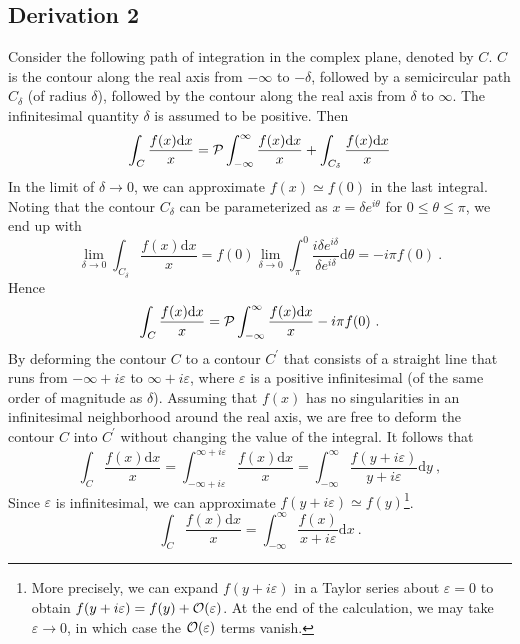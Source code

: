 \documentclass[11pt,a4paper]{article}
\newcommand{\dif}{\mathrm{d}}
\begin{document}
\subsection{Derivation 2}
Consider the following path of integration in the complex plane, denoted by $C$. $C$ is the contour along the real axis from $-\infty$ to $-\delta$, followed by a semicircular path $C_\delta$ (of radius $\delta$), followed by the contour along the real axis from $\delta$ to $\infty$. The infinitesimal quantity $\delta$ is assumed to be positive. Then
\begin{equation}
\int_{C} \dfrac{f(x) \dif x}{x} = {\cal P} \int_{-\infty}^\infty \dfrac{f(x) \dif x}{x} +\int_{C_\delta} \dfrac{f(x) \dif x}{x}
\end{equation}
In the limit of $\delta \rightarrow 0$, we can approximate $f(x) \simeq f(0)$ in the last integral. Noting that the contour $C_\delta$ can be parameterized as $x = \delta e^{i\theta}$ for $0 \leqslant \theta \leqslant \pi$, we end up with 
\begin{equation}
 \lim_{\delta \rightarrow 0} \int_{C_\delta} \dfrac{f(x) \dif x}{x} = f(0) \lim_{\delta \rightarrow 0} \int_\pi^0 \dfrac{i\delta e^{i\delta}}{\delta e^{i\delta}} \dif \theta = -i\pi f(0) ~.
\end{equation}
Hence 
\begin{equation}
\int_{C} \dfrac{f(x) \dif x}{x} = {\cal P} \int_{-\infty}^\infty \dfrac{f(x) \dif x}{x} -i\pi f(0) ~.
\end{equation}
By deforming the contour $C$ to a contour $C^\prime$ that consists of a straight line that runs from $-\infty +i\varepsilon$ to $\infty +i\varepsilon$, where $\varepsilon$ is a positive infinitesimal (of the same order of magnitude as $\delta$). Assuming that $f(x)$ has no singularities in an infinitesimal neighborhood around the real axis, we are free to deform the contour $C$ into $C^\prime$ without changing the value of the integral. It follows that
\begin{equation}
\int_{C} \dfrac{f(x) \dif x}{x} = \int_{-\infty +i\varepsilon}^{\infty +i\varepsilon} \dfrac{f(x) \dif x}{x} = \int_{-\infty}^{\infty} \dfrac{f(y+i\varepsilon)}{y+i\varepsilon} \dif y~,
\end{equation}
Since $\varepsilon$ is infinitesimal, we can approximate $f(y+i\varepsilon) \simeq f(y)$\footnote{More precisely, we can expand $f(y+i\varepsilon)$ in a Taylor series about $\varepsilon = 0$ to obtain $f(y+i\varepsilon) = f(y)+{\cal O}(\varepsilon)$. At the end of the calculation, we may take $\varepsilon \rightarrow 0$, in which case the ${\cal O}(\varepsilon)$ terms vanish.}. 
\begin{equation}
\int_{C} \dfrac{f(x) \dif x}{x} = \int_{-\infty}^{\infty} \dfrac{f(x)}{x+i\varepsilon} \dif x ~.
\end{equation}
\end{document}
